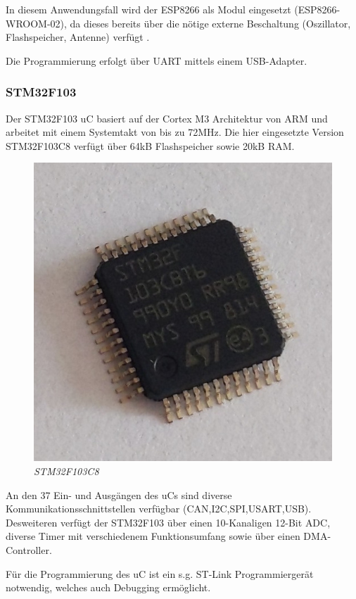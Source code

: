 \smallskip

In diesem Anwendungsfall wird der ESP8266 als Modul eingesetzt (ESP8266-WROOM-02), da dieses bereits über die nötige externe Beschaltung (Oszillator, Flashspeicher, Antenne)
verfügt \citep{ESP8266_Datasheet}.

\smallskip

Die Programmierung erfolgt über \ac{UART} mittels einem USB-Adapter.

\subsubsection{STM32F103}

Der STM32F103 \ac{uC} basiert auf der Cortex M3 Architektur von ARM und arbeitet mit einem Systemtakt von bis zu 72MHz. Die hier eingesetzte 
Version STM32F103C8 verfügt über 64kB Flashspeicher sowie 20kB \ac{RAM}.

\begin{figure}
     \vspace{-\baselineskip}
         \centering
         \includegraphics[scale=0.8]{Pictures/stm32f103.jpg}
         \caption{\textit{STM32F103C8}}
         \label{img:STM32F103C8}
 \end{figure}

\smallskip

An den 37 Ein- und Ausgängen des \acp{uC} sind diverse Kommunikationsschnittstellen verfügbar (CAN,I2C,SPI,USART,USB). 
Desweiteren verfügt der STM32F103 über einen 10-Kanaligen 12-Bit \acs{ADC}, diverse Timer mit verschiedenem Funktionsumfang
sowie über einen \acs{DMA}-Controller. 

\smallskip

Für die Programmierung des \ac{uC} ist ein s.g. ST-Link Programmiergerät notwendig, welches auch Debugging ermöglicht.


